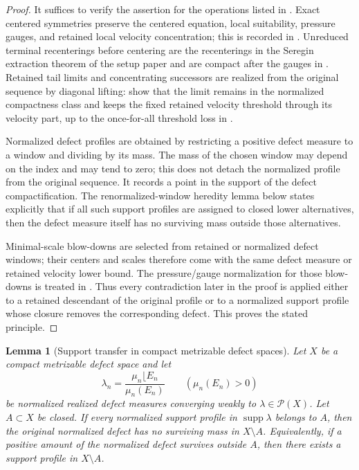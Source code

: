 \documentclass[11pt]{amsart}
\numberwithin{equation}{section}
\theoremstyle{plain}
\newtheorem{lemma}[lemma]{Lemma}
\theoremstyle{definition}
\theoremstyle{remark}
\begin{document}
\begin{proof}
It suffices to verify the assertion for the operations listed in
.  Exact centered
symmetries preserve the centered equation, local suitability, pressure gauges,
and retained local velocity concentration; this is recorded in
.
Unreduced terminal recenterings before centering are the recenterings in the Seregin
extraction theorem of the setup paper and are compact after the gauges in
.  Retained tail limits and concentrating
successors are realized from the original sequence by diagonal lifting:
 show that the
limit remains in the normalized compactness class and keeps the fixed retained velocity
threshold through its velocity part, up to the once-for-all threshold loss in
.

Normalized defect profiles are obtained by restricting a positive defect
measure to a window and dividing by its mass.  The mass of the chosen window may
depend on the index and may tend to zero; this does not detach the normalized
profile from the original sequence.  It records a point in the support of the
defect compactification.  The renormalized-window heredity lemma
 below states explicitly that if all
such support profiles are assigned to closed lower alternatives, then the
defect measure itself has no surviving mass outside those alternatives.

Minimal-scale blow-downs are selected from retained or normalized defect windows;
their centers and scales therefore come with the same defect measure or
retained velocity lower bound.  The pressure/gauge normalization for those blow-downs
is treated in
.
Thus every contradiction later in the proof is applied either to a retained
descendant of the original profile or to a normalized support profile whose
closure removes the corresponding defect.  This proves the stated
principle.
\end{proof}

\begin{lemma}[Support transfer in compact metrizable defect spaces]
\label{lem:compact-defect-support-transfer}
Let \(X\) be a compact metrizable defect space and let
\[
   \lambda_n=\frac{\mu_n\lfloor E_n}{\mu_n(E_n)}
   \qquad(\mu_n(E_n)>0)
\]
be normalized realized defect measures converging weakly to
\(\lambda\in\mathcal P(X)\).  Let \(A\subset X\) be closed.  If every
normalized support profile in \(\operatorname{supp}\lambda\) belongs to \(A\),
then the original normalized defect has no surviving mass in \(X\setminus A\).
Equivalently, if a positive amount of the normalized defect survives outside
\(A\), then there exists a support profile in \(X\setminus A\).
\end{lemma}
\end{document}
